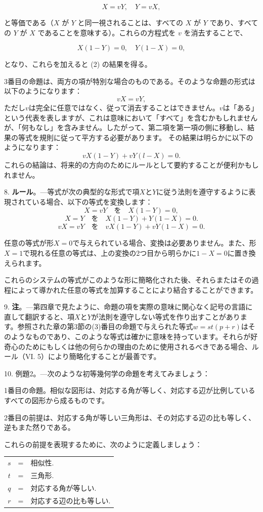 \documentclass[a4paper,11pt,openany]{ltjsbook}
\begin{document}
\[
X = vY, \quad Y = vX,
\]

と等価である（$X$ が $Y$ と同一視されることは、すべての $X$ が $Y$ であり、すべての $Y$ が $X$ であることを意味する）。これらの方程式を $v$ を消去することで、

\[
X(1 - Y) = 0, \quad Y(1 - X) = 0,
\]

となり、これらを加えると (2) の結果を得る。

3番目の命題は、両方の項が特別な場合のものである。そのような命題の形式は以下のようになります：
\[
vX = vY,
\]
ただし$v$は完全に任意ではなく、従って消去することはできません。$v$は「ある」という代表を表しますが、これは意味において「すべて」を含むかもしれませんが、「何もなし」を含みません。したがって、第二項を第一項の側に移動し、結果の等式を規則に従って平方する必要があります。
その結果は明らかに以下のようになります：
\[
vX(1 - Y) + vY(l - X) = 0.
\]
これらの結論は、将来的の方向のためにルールとして要約することが便利かもしれません。

8. \textbf{ルール}。---等式が次の典型的な形式で項$X$と$Y$に従う法則を遵守するように表現されている場合、以下の等式を変換します：
\[
X = vY \quad \text{を} \quad X(1 - Y) = 0,
\]
\[
X = Y \quad \text{を} \quad X(1 - Y) + Y(1 - X) = 0.
\]
\[
vX = vY \quad \text{を} \quad vX(1 - Y) + vY(1 - X) = 0.
\]

任意の等式が形$X = 0$で与えられている場合、変換は必要ありません。また、形$X = 1$で現れる任意の等式は、上の変換の2つ目から明らかに$1 - X = 0$に置き換えられます。

これらのシステムの等式がこのような形に簡略化された後、それらまたはその過程によって導かれた任意の等式を加算することにより結合することができます。

9. \textbf{注}。---第四章で見たように、命題の項を実際の意味に関心なく記号の言語に直して翻訳すると、項$X$と$Y$が法則を遵守しない等式を作り出すことがあります。参照された章の第3節の(3)番目の命題で与えられた等式$w = st(p + r)$はそのようなものであり、このような等式は確かに意味を持っています。それらが好奇心のためにもしくは他の何らかの理由のために使用されるべきである場合、ルール（VI. 5）により簡略化することが最善です。

10. 例題2。---次のような初等幾何学の命題を考えてみましょう：

1番目の命題。相似な図形は、対応する角が等しく、対応する辺が比例しているすべての図形から成るものです。

2番目の前提は、対応する角が等しい三角形は、その対応する辺の比も等しく、逆もまた然りである。

これらの前提を表現するために、次のように定義しましょう：
\begin{tabular}{c l l}
$s$ &= &相似性. \\
$t$ &= &三角形. \\
$q$ &= &対応する角が等しい. \\
$r$ &= &対応する辺の比も等しい. \\
\end{tabular}
\end{document}
